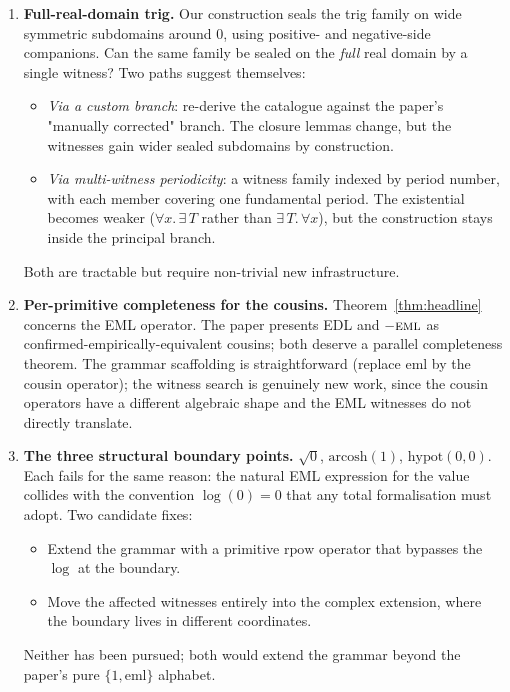 \documentclass[11pt]{article}
\theoremstyle{plain}
\theoremstyle{definition}
\begin{document}
\begin{enumerate}[topsep=2pt, itemsep=4pt, label=\textbf{C\arabic*}]
\item \textbf{Full-real-domain trig.}
  Our construction seals the trig family on wide symmetric subdomains
  around $0$, using positive- and negative-side companions. Can the
  same family be sealed on the \emph{full} real domain by a single
  witness? Two paths suggest themselves:
  \begin{itemize}[topsep=2pt, itemsep=2pt]
    \item \emph{Via a custom branch}: re-derive the catalogue against
      the paper's "manually corrected" branch. The closure lemmas
      change, but the witnesses gain wider sealed subdomains by
      construction.
    \item \emph{Via multi-witness periodicity}: a witness family
      indexed by period number, with each member covering one
      fundamental period. The existential becomes weaker
      ($\forall x.\,\exists\,T$ rather than $\exists\,T.\,\forall x$),
      but the construction stays inside the principal branch.
  \end{itemize}
  Both are tractable but require non-trivial new infrastructure.

\item \textbf{Per-primitive completeness for the cousins.}
  Theorem~\ref{thm:headline} concerns the EML operator. The paper
  presents EDL and $-\textsc{eml}$ as confirmed-empirically-equivalent
  cousins; both deserve a parallel completeness theorem. The grammar
  scaffolding is straightforward (replace $\mathrm{eml}$ by the cousin
  operator); the witness search is genuinely new work, since the
  cousin operators have a different algebraic shape and the EML
  witnesses do not directly translate.

\item \textbf{The three structural boundary points.}
  $\sqrt{0}$, $\mathrm{arcosh}(1)$, $\mathrm{hypot}(0, 0)$. Each fails
  for the same reason: the natural EML expression for the value
  collides with the convention $\log(0) = 0$ that any total
  formalisation must adopt. Two candidate fixes:
  \begin{itemize}[topsep=2pt, itemsep=2pt]
    \item Extend the grammar with a primitive $\mathrm{rpow}$ operator
      that bypasses the $\log$ at the boundary.
    \item Move the affected witnesses entirely into the complex
      extension, where the boundary lives in different coordinates.
  \end{itemize}
  Neither has been pursued; both would extend the grammar beyond
  the paper's pure $\{1, \mathrm{eml}\}$ alphabet.
\end{enumerate}
\end{document}
